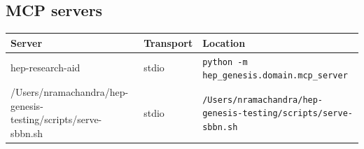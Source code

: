 \documentclass[11pt,a4paper]{article}
\begin{document}
\subsection{MCP servers}
\begin{longtable}{@{}p{}p{}p{}@{}}
\toprule Server & Transport & Location \\ \midrule \endhead
hep-research-aid & stdio & \texttt{python -m hep\_\allowbreak{}genesis.domain.mcp\_\allowbreak{}server} \\
/Users/nramachandra/hep-genesis-testing/scripts/serve-sbbn.sh & stdio & \texttt{/\allowbreak{}Users/\allowbreak{}nramachandra/\allowbreak{}hep-genesis-testing/\allowbreak{}scripts/\allowbreak{}serve-sbbn.sh} \\
\bottomrule\end{longtable}
\end{document}
